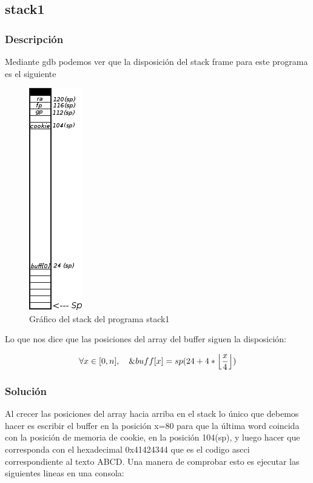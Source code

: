 \documentclass[a4paper,10pt]{article}
\DeclarePairedDelimiter\floor{\lfloor}{\rfloor}
\begin{document}
\subsection{stack1}
\lstset{ language = C, numbers=left, tabsize=4, breaklines=true, frame=single }


\subsubsection{Descripción}

\bigskip
Mediante gdb podemos ver que la disposición del stack frame para este programa es el siguiente

\bigskip

\begin{figure}[h!]
	\centering
	\includegraphics[scale=0.7]{./recursos/stack1.png}
	\caption{Gr\'afico del stack del programa stack1}
    \label{fig:stack1}
\end{figure}


\bigskip
Lo que nos dice que las posiciones del array del buffer siguen la disposición:

\begin{equation*}
\forall x \in [0,n], \quad \&buff[x]=sp(24+ 4 * \floor*{\frac{x}{4}})
\end{equation*}


\subsubsection{Solución}

Al crecer las posiciones del array hacia arriba en el stack lo único que debemos hacer es escribir el buffer en la posición x=80  para que la última word coincida con la posición de memoria de cookie, en la posición 104(sp), y luego hacer que corresponda con el hexadecimal 0x41424344 que es el codigo ascci correspondiente al texto ABCD.
\bigskip
Una manera de comprobar esto es ejecutar las siguientes lineas en una consola:
\end{document}
